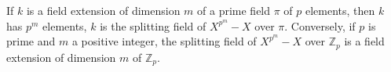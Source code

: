 If $k$ is a field extension of dimension $m$ of a prime field $\pi$ of $p$ elements, then $k$ has $p^m$ elements, $k$ is the splitting field of $X^{p^m} - X$ over $\pi$. Conversely, if $p$ is prime and $m$ a positive integer, the splitting field of $X^{p^m} - X$ over $\mathbb{Z}_p$ is a field extension of dimension $m$ of $\mathbb{Z}_p$.
